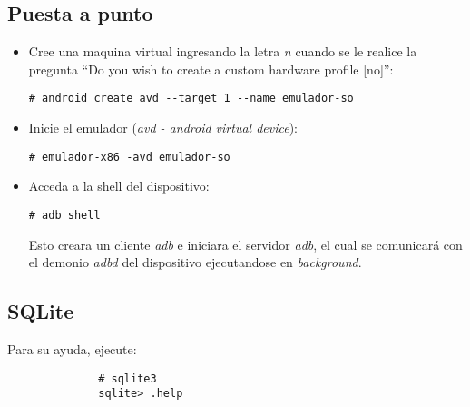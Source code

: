 \subsection{Puesta a punto}
\begin{itemize}
    \item Cree una maquina virtual ingresando la letra \textit{n} cuando se le realice la pregunta ``Do you wish to create a custom hardware profile [no]'':
    \begin{lstlisting}
# android create avd --target 1 --name emulador-so
    \end{lstlisting}

    \item Inicie el emulador (\textit{avd - android virtual device}):
    \begin{lstlisting}
# emulador-x86 -avd emulador-so
    \end{lstlisting}

    \item Acceda a la shell del dispositivo:
    \begin{lstlisting}
# adb shell
    \end{lstlisting}
    Esto creara un cliente \textit{adb} e iniciara el servidor \textit{adb}, el cual se comunicará con el demonio \textit{adbd} del dispositivo ejecutandose en \textit{background}.
\end{itemize}

\subsection{SQLite}
Para su ayuda, ejecute:
\begin{lstlisting}
		      # sqlite3
		      sqlite> .help
\end{lstlisting}

